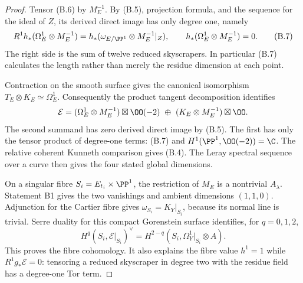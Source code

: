 \begin{proof}
Tensor (B.6) by $M_E^{-1}$. By (B.5), projection formula, and the sequence for the ideal of $Z$, its derived direct image has only degree one, namely
\[
 R^1h_*(\Omega^1_E\otimes M_E^{-1})
 =h_*(\omega_{E/\PP^1}\otimes M_E^{-1}|_Z),
 \qquad h_*(\Omega^1_E\otimes M_E^{-1})=0.             \tag{B.7}
\]
The right side is the sum of twelve reduced skyscrapers. In particular (B.7) calculates the length rather than merely the residue dimension at each point.

Contraction on the smooth surface gives the canonical isomorphism $T_E\otimes K_E\simeq\Omega^1_E$. Consequently the product tangent decomposition identifies
\[
\mathcal E=(\Omega^1_E\otimes M_E^{-1})\boxtimes\OO(-2)
 \ \oplus\ (K_E\otimes M_E^{-1})\boxtimes\OO.
\]
The second summand has zero derived direct image by (B.5). The first has only the tensor product of degree-one terms: (B.7) and $H^1(\PP^1,\OO(-2))=\C$. The relative coherent Kunneth comparison gives (B.4). The Leray spectral sequence over a curve then gives the four stated global dimensions.

On a singular fibre $S_i=E_{t_i}\times\PP^1$, the restriction of $M_E$ is a nontrivial $A_\lambda$. Statement B1 gives the two vanishings and ambient dimensions $(1,1,0)$. Adjunction for the Cartier fibre gives $\omega_{S_i}=K_Y|_{S_i}$, because its normal line is trivial. Serre duality for this compact Gorenstein surface identifies, for $q=0,1,2$,
\[
 H^q(S_i,\mathcal E|_{S_i})^\vee
 =H^{2-q}(S_i,\Omega_Y^1|_{S_i}\otimes A).
\]
This proves the fibre cohomology. It also explains the fibre value $h^1=1$ while $R^1g_*\mathcal E=0$: tensoring a reduced skyscraper in degree two with the residue field has a degree-one Tor term.
\end{proof}



